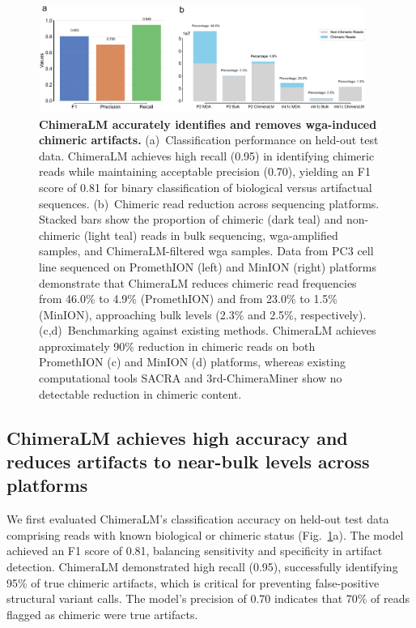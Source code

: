 \documentclass[pdflatex,sn-nature,lineno]{sn-jnl}%
\theoremstyle{thmstyleone}%
\theoremstyle{thmstyletwo}%
\theoremstyle{thmstylethree}%
\begin{document}
\begin{figure}[!ht]
	\begin{center}
		\includegraphics[width=0.95\textwidth]{final_figures/figure2}
	\end{center}
    \caption{{\bf ChimeraLM accurately identifies and removes \gls{wga}-induced chimeric artifacts.}
	(a)~Classification performance on held-out test data.
    ChimeraLM achieves high recall (0.95) in identifying chimeric reads while maintaining acceptable precision (0.70), yielding an F1 score of 0.81 for binary classification of biological versus artifactual sequences.
	(b)~Chimeric read reduction across sequencing platforms.
    Stacked bars show the proportion of chimeric (dark teal) and non-chimeric (light teal) reads in bulk sequencing, \gls{wga}-amplified samples, and ChimeraLM-filtered \gls{wga} samples.
    Data from PC3 cell line sequenced on PromethION (left) and MinION (right) platforms demonstrate that ChimeraLM reduces chimeric read frequencies from 46.0\% to 4.9\% (PromethION) and from 23.0\% to 1.5\% (MinION), approaching bulk levels (2.3\% and 2.5\%, respectively).
	(c,d)~Benchmarking against existing methods.
    ChimeraLM achieves approximately 90\% reduction in chimeric reads on both PromethION (c) and MinION (d) platforms, whereas existing computational tools SACRA and 3rd-ChimeraMiner show no detectable reduction in chimeric content.}\label{fig:figure2}
\end{figure}

\subsection*{ChimeraLM achieves high accuracy and reduces artifacts to near-bulk levels across platforms}

We first evaluated ChimeraLM's classification accuracy on held-out test data comprising reads with known biological or chimeric status (Fig.~\ref{fig:figure2}a).
The model achieved an F1 score of 0.81, balancing sensitivity and specificity in artifact detection.
ChimeraLM demonstrated high recall (0.95), successfully identifying 95\% of true chimeric artifacts, which is critical for preventing false-positive structural variant calls.
The model's precision of 0.70 indicates that 70\% of reads flagged as chimeric were true artifacts.
\end{document}
